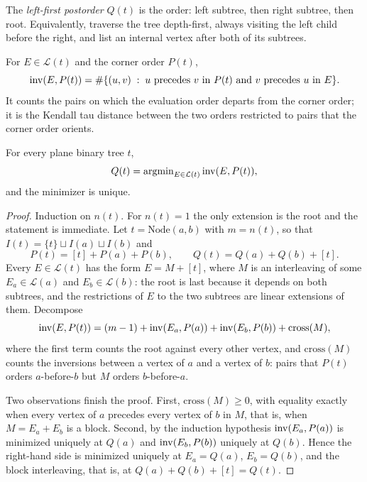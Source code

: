 \begin{definition}\label{def:postorder}
The \emph{left-first postorder} $Q(t)$ is the order: left subtree, then right
subtree, then root.  Equivalently, traverse the tree depth-first, always visiting the
left child before the right, and list an internal vertex after both of its subtrees.
\end{definition}

\begin{definition}\label{def:inversions}
For $E\in\mathcal{L}(t)$ and the corner order $P(t)$,
\[
\operatorname{inv}(E,P(t))=\#\{(u,v)\;:\;u\text{ precedes }v\text{ in }P(t)\ \text{and}\ v
\text{ precedes }u\text{ in }E\}.
\]
It counts the pairs on which the evaluation order departs from the corner order; it
is the Kendall tau distance between the two orders restricted to pairs that the
corner order orients.
\end{definition}

\begin{theorem}\label{thm:canonical-order}
For every plane binary tree $t$,
\[
Q(t)=\operatorname{argmin}_{E\in\mathcal{L}(t)}\operatorname{inv}(E,P(t)),
\]
and the minimizer is unique.
\end{theorem}

\begin{proof}
Induction on $n(t)$.  For $n(t)=1$ the only extension is the root and the statement
is immediate.  Let $t=\mathrm{Node}(a,b)$ with $m=n(t)$, so that
$I(t)=\{t\}\sqcup I(a)\sqcup I(b)$ and
\[
P(t)=[t]+P(a)+P(b),\qquad Q(t)=Q(a)+Q(b)+[t].
\]
Every $E\in\mathcal{L}(t)$ has the form $E=M+[t]$, where $M$ is an interleaving of
some $E_a\in\mathcal{L}(a)$ and $E_b\in\mathcal{L}(b)$: the root is last because it
depends on both subtrees, and the restrictions of $E$ to the two subtrees are linear
extensions of them.  Decompose
\[
\operatorname{inv}(E,P(t))=(m-1)+\operatorname{inv}(E_a,P(a))+\operatorname{inv}(E_b,P(b))+\mathrm{cross}(M),
\]
where the first term counts the root against every other vertex, and
$\mathrm{cross}(M)$ counts the inversions between a vertex of $a$ and a vertex of
$b$: pairs that $P(t)$ orders $a$-before-$b$ but $M$ orders $b$-before-$a$.

Two observations finish the proof.  First, $\mathrm{cross}(M)\ge 0$, with equality
exactly when every vertex of $a$ precedes every vertex of $b$ in $M$, that is, when
$M=E_a+E_b$ is a block.  Second, by the induction hypothesis
$\operatorname{inv}(E_a,P(a))$ is minimized uniquely at $Q(a)$ and $\operatorname{inv}(E_b,P(b))$ uniquely at
$Q(b)$.  Hence the right-hand side is minimized uniquely at
$E_a=Q(a)$, $E_b=Q(b)$, and the block interleaving, that is, at
$Q(a)+Q(b)+[t]=Q(t)$.
\end{proof}

